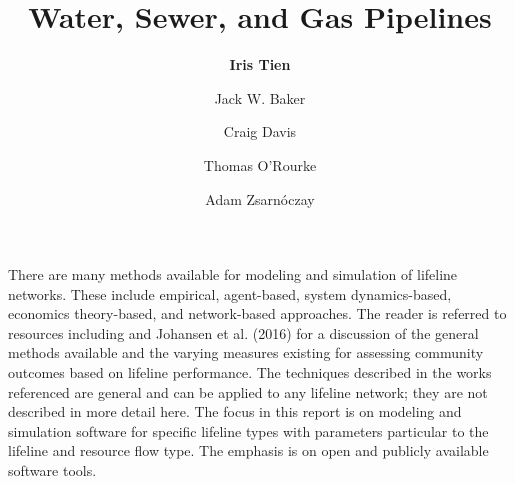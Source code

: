 %
%
%

\title{Water, Sewer, and Gas Pipelines}
\author{
    \textbf{Iris Tien}
    \and {Jack W. Baker}
    \and {Craig Davis}
    \and {Thomas O'Rourke}
    \and {Adam Zsarnóczay}}
\tocauthor{}
%
%
\maketitle

There are many methods available for modeling and simulation of lifeline networks. These include empirical, agent-based, system dynamics-based, economics theory-based, and network-based approaches. The reader is referred to resources including \cite{ouyang2014review} and Johansen et al. (2016) for a discussion of the general methods available and the varying measures existing for assessing community outcomes based on lifeline performance. The techniques described in the works referenced are general and can be applied to any lifeline network; they are not described in more detail here. The focus in this report is on modeling and simulation software for specific lifeline types with parameters particular to the lifeline and resource flow type. The emphasis is on open and publicly available software tools.

